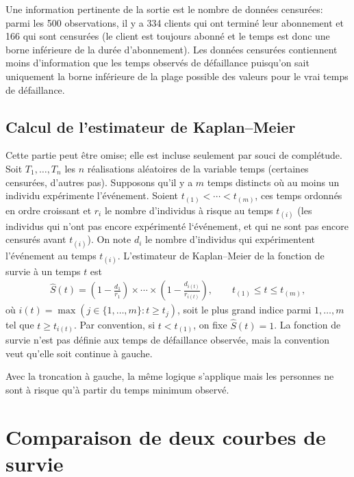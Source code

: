 \documentclass[
  11pt,
  letterpaper,
]{book}
\theoremstyle{definition}
\theoremstyle{remark}
\begin{document}
Une information pertinente de la sortie est le nombre de données
censurées: parmi les 500 observations, il y a 334 clients qui ont
terminé leur abonnement et 166 qui sont censurées (le client est
toujours abonné et le temps est donc une borne inférieure de la durée
d'abonnement). Les données censurées contiennent moins d'information que
les temps observés de défaillance puisqu'on sait uniquement la borne
inférieure de la plage possible des valeurs pour le vrai temps de
défaillance.

\hypertarget{calcul-de-lestimateur-de-kaplanmeier}{%
\subsection{Calcul de l'estimateur de
Kaplan--Meier}\label{calcul-de-lestimateur-de-kaplanmeier}}

Cette partie peut être omise; elle est incluse seulement par souci de
complétude. Soit \(T_1, \ldots, T_n\) les \(n\) réalisations aléatoires
de la variable temps (certaines censurées, d'autres pas). Supposons
qu'il y a \(m\) temps distincts où au moins un individu expérimente
l'événement. Soient \(t_{(1)} < \cdots < t_{(m)}\), ces temps ordonnés
en ordre croissant et \(r_i\) le nombre d'individus à risque au temps
\(t_{(i)}\) (les individus qui n'ont pas encore expérimenté l`événement,
et qui ne sont pas encore censurés avant \(t_{(i)}\)). On note \(d_i\)
le nombre d'individus qui expérimentent l'événement au temps
\(t_{(i)}\). L'estimateur de Kaplan--Meier de la fonction de survie à un
temps \(t\) est \begin{align*}
 \widehat{S}(t) = \left( 1- \frac{d_1}{r_1}\right) \times \cdots \times \left( 1- \frac{d_{i(t)}}{r_{i(t)}}\right), \qquad t_{(1)} \leq t \leq t_{(m)},
\end{align*} où \(i(t) =\max(j \in \{1, \ldots, m\}: t \geq t_{j})\),
soit le plus grand indice parmi \(1, \ldots, m\) tel que
\(t \geq t_{i(t)}\). Par convention, si \(t < t_{(1)}\), on fixe
\(\widehat{S}(t)=1\). La fonction de survie n'est pas définie aux temps
de défaillance observée, mais la convention veut qu'elle soit continue à
gauche.

Avec la troncation à gauche, la même logique s'applique mais les
personnes ne sont à risque qu'à partir du temps minimum observé.

\hypertarget{comparaison-de-deux-courbes-de-survie}{%
\section{Comparaison de deux courbes de
survie}\label{comparaison-de-deux-courbes-de-survie}}
\end{document}
